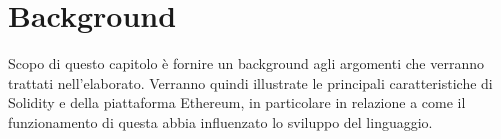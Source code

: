 \documentclass[12pt,a4paper,openright,oneside]{report}
\theoremstyle{definition}
\begin{document}
\clearpage{\pagestyle{empty}\cleardoublepage}
\tableofcontents

\rhead[\fancyplain{}{\bfseries\leftmark}]{\fancyplain{}{\bfseries\thepage}}

\clearpage{\pagestyle{empty}\cleardoublepage}
\lstlistoflistings

\clearpage{\pagestyle{empty}\cleardoublepage}
\listoftables

\clearpage{\pagestyle{empty}\cleardoublepage}
\lhead[\fancyplain{}{\bfseries\thepage}]{\fancyplain{}{\bfseries\rightmark}}

\chapter{Background}\label{bg}
Scopo di questo capitolo \`{e} fornire un background agli argomenti che verranno trattati nell'elaborato. Verranno quindi illustrate le principali caratteristiche di Solidity e della piattaforma Ethereum, in particolare in relazione a come il funzionamento di questa abbia influenzato lo sviluppo del linguaggio.
\end{document}
